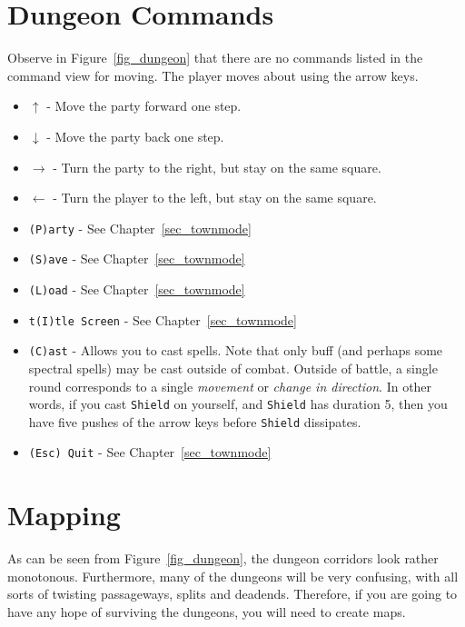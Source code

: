 \documentclass{report}
\begin{document}
\section{Dungeon Commands}
    Observe in Figure~\ref{fig_dungeon} that there are no commands listed in the command view for moving. The player moves about using the arrow keys.
    \begin{itemize}
        \item {\color{green!50!black} $\uparrow$} - Move the party forward one step.
        \item {\color{green!50!black} $\downarrow$} - Move the party back one step.
        \item {\color{green!50!black} $\rightarrow$} - Turn the party to the right, but stay on the same square.
        \item {\color{green!50!black} $\leftarrow$} - Turn the player to the left, but stay on the same square.
        \item \verb|(P)arty| - See Chapter~\ref{sec_townmode}
        \item \verb|(S)ave| - See Chapter~\ref{sec_townmode}
        \item \verb|(L)oad| - See Chapter~\ref{sec_townmode}
        \item \verb|t(I)tle Screen| - See Chapter~\ref{sec_townmode}
        \item \verb|(C)ast| - Allows you to cast spells. Note that only buff
        (and perhaps some spectral spells) may be cast outside of combat. Outside
        of battle, a single round corresponds to a single \emph{movement} or
        \emph{change in direction}. In 
        other words, if you cast \verb|Shield| on yourself, and \verb|Shield| has
        duration 5, then you have five pushes of the arrow keys before 
        \verb|Shield| dissipates.
        \item \verb|(Esc) Quit| - See Chapter~\ref{sec_townmode}
    \end{itemize}

\section{Mapping}
    As can be seen from Figure~\ref{fig_dungeon}, the dungeon corridors look rather
    monotonous. Furthermore, many of the dungeons will be very confusing, with all
    sorts of twisting passageways, splits and deadends. Therefore, if you are going
    to have any hope of surviving the dungeons, you will need to create maps. 
\end{document}
